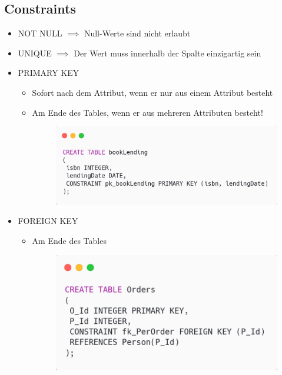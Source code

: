 \subsection{Constraints}
\begin{itemize}
    \item NOT NULL $\implies$ Null-Werte sind nicht erlaubt
    \item UNIQUE $\implies$ Der Wert muss innerhalb der Spalte einzigartig sein
    \item PRIMARY KEY 
    \begin{itemize}
        \item Sofort nach dem Attribut, wenn er nur aus einem Attribut besteht
        \item Am Ende des Tables, wenn er aus mehreren Attributen besteht!
        \begin{figure}[H]
            \centering
            \includegraphics[scale=.3]{res/themenkorb_3/pk.png}
        \end{figure}
    \end{itemize}
    \item FOREIGN KEY
    \begin{itemize}
        \item Am Ende des Tables
        \begin{figure}[H]
            \centering
            \includegraphics[scale=.3]{res/themenkorb_3/fk.png}
        \end{figure}

\end{itemize}
\end{itemize}
